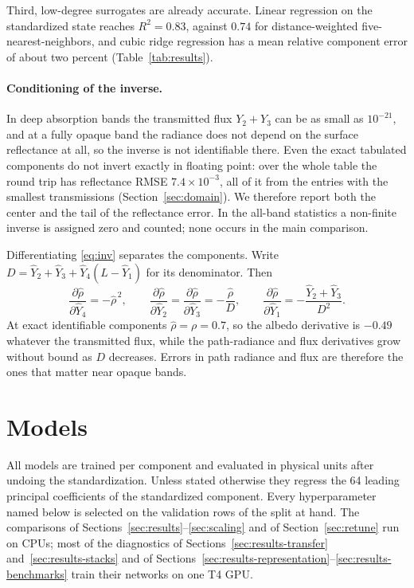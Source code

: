 \documentclass[11pt]{article}
\newcommand{\1}{\mathbf{1}}
\begin{document}
Third, low-degree surrogates are already accurate. Linear regression on the standardized
state reaches $R^2=0.83$, against $0.74$ for distance-weighted five-nearest-neighbors, and
cubic ridge regression has a mean relative component error of about two percent
(Table~\ref{tab:results}).

\paragraph{Conditioning of the inverse.}
In deep absorption bands the transmitted flux $Y_2+Y_3$ can be as small as $10^{-21}$, and at
a fully opaque band the radiance does not depend on the surface reflectance at all, so the
inverse is not identifiable there. Even the exact tabulated components do not invert exactly in
floating point: over the whole table the round trip has reflectance RMSE $7.4\times10^{-3}$, all
of it from the entries with the smallest transmissions (Section~\ref{sec:domain}). We therefore
report both the center and the tail of the reflectance error. In the all-band statistics a
non-finite inverse is assigned zero and counted; none occurs in the main comparison.

Differentiating \eqref{eq:inv} separates the components. Write $D = \hat Y_2 + \hat Y_3 +
\hat Y_4 (L - \hat Y_1)$ for its denominator. Then
\begin{equation}\label{eq:sens}
\frac{\partial\hat\rho}{\partial \hat Y_4} = -\hat\rho^{\,2},
\qquad
\frac{\partial\hat\rho}{\partial \hat Y_2} = \frac{\partial\hat\rho}{\partial \hat Y_3}
 = -\frac{\hat\rho}{D},
\qquad
\frac{\partial\hat\rho}{\partial \hat Y_1} = -\frac{\hat Y_2 + \hat Y_3}{D^{2}} .
\end{equation}
At exact identifiable components $\hat\rho=\rho=0.7$, so the albedo derivative is $-0.49$
whatever the transmitted flux, while the path-radiance and flux derivatives grow without bound
as $D$ decreases. Errors in path radiance and flux are therefore the ones that matter near
opaque bands.



\section{Models}\label{sec:methods}

All models are trained per component and evaluated in physical units after undoing the
standardization. Unless stated otherwise they regress the 64 leading principal coefficients of
the standardized component. Every hyperparameter named below is selected on the validation
rows of the split at hand. The comparisons of Sections~\ref{sec:results}--\ref{sec:scaling} and
of Section~\ref{sec:retune} run on CPUs; most of the diagnostics of Sections~\ref{sec:results-transfer}
and~\ref{sec:results-stacks} and of Sections~\ref{sec:results-representation}--\ref{sec:results-benchmarks}
train their networks on one T4 GPU.
\end{document}

